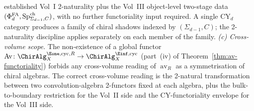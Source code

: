 \begin{remark}
established Vol~I 2-naturality plus the Vol~III object-level
two-stage data $(\Phi^{\mathrm{FA}}_d, \mathrm{Sp}^{\mathrm{ch}}_{\Sigma_{d-1}, C})$, with no
further functoriality input required. A single CY$_d$ category
produces a family of chiral shadows indexed by $(\Sigma_{d-1}, C)$;
the 2-naturality discipline applies separately on each member of
the family.
\emph{(c) Cross-volume scope.}
The non-existence of a global functor
$\mathrm{Av}\colon \ChirAlg^{\Eone,\mathrm{cyc},R}_X \to
\ChirAlg^{\Einf,\mathrm{cyc}}_X$ \textup{(}part~\textup{(iv)} of
Theorem~\textup{\ref{thm:av-functoriality}}\textup{)} forbids
any cross-volume reading of $\operatorname{av}_R$ as a symmetrisation
of chiral algebras. The correct cross-volume reading is the
2-natural transformation between two convolution-algebra
2-functors fixed at each algebra, plus the bulk-to-boundary
restriction for the Vol~II side and the
CY-functoriality envelope for the Vol~III side.
\end{remark}

